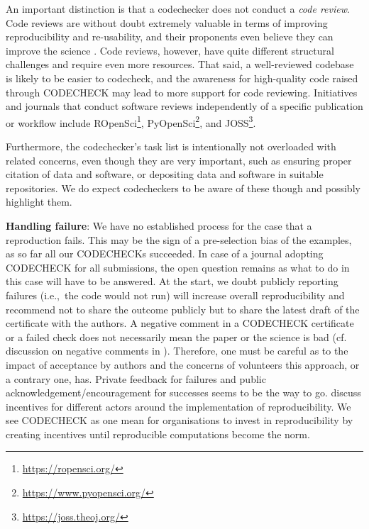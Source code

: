\documentclass[12pt]{article}
\begin{document}
An important distinction is that a codechecker does not conduct a 
\emph{code review}. Code reviews are without doubt extremely valuable in 
terms of improving reproducibility and re-usability, and their proponents 
even believe they can improve the science \cite{petre_code_2014}.
Code reviews, however, have quite different structural challenges and 
require even more resources. That said, a well-reviewed codebase is likely
to be easier to codecheck, and the awareness for high-quality code raised
through CODECHECK may lead to more support for code reviewing.
Initiatives and journals that conduct software reviews independently of 
a specific publication or workflow include
ROpenSci\footnote{\url{https://ropensci.org/}},
PyOpenSci\footnote{\url{https://www.pyopensci.org/}},
and JOSS\footnote{\url{https://joss.theoj.org/}}.

Furthermore, the codechecker's task list is intentionally not
overloaded with related concerns, even though they are very important,
such as ensuring proper citation of data and software, or depositing
data and software in suitable repositories. We do expect codecheckers
to be aware of these though and possibly highlight them.

\textbf{Handling failure}: We have no established process for the case
that a reproduction fails. This may be the sign of a pre-selection bias
of the examples, as so far all our CODECHECKs succeeded.
In case of a journal adopting CODECHECK for all submissions, the open 
question remains as what to do in this case will have to be answered.
At the start, we doubt publicly reporting failures (i.e.,~the code 
would not run) will increase overall reproducibility and recommend not
to share the outcome publicly but to share the latest draft of the 
certificate with the authors.
A negative comment in a CODECHECK certificate or a failed check does
not necessarily mean the paper or the science is bad
(cf. discussion on negative comments in \cite{everythinghertz123}).
Therefore, one must be careful as to the impact of acceptance by authors 
and the concerns of volunteers this approach, or a contrary one, has.
Private feedback for failures and public acknowledgement/encouragement
for successes seems to be the way to go.
\cite{Rosenthal2016b} discuss incentives for different actors around the
implementation of reproducibility. We see CODECHECK as one mean for
organisations to invest in reproducibility by creating incentives
until reproducible computations become the norm.
\end{document}
